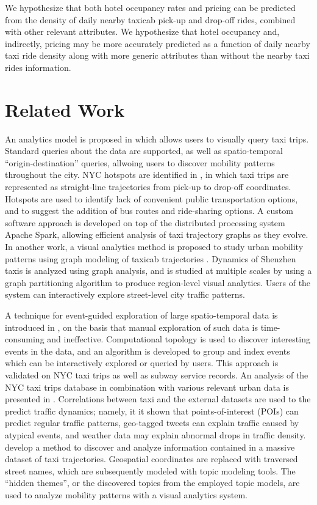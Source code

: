 \documentclass[useAMS, referee, usenatbib]{biom}
\begin{document}
We hypothesize that both hotel occupancy rates and pricing can be predicted from the density of daily nearby taxicab pick-up and drop-off rides, combined with other relevant attributes. We hypothesize that hotel occupancy and, indirectly, pricing may be more accurately predicted as a function of daily nearby taxi ride density along with more generic attributes than without the nearby taxi rides information.

\section{Related Work}
\label{s:related}

An analytics model is proposed in \citet{Ferreira2013VisualEO} which allows users to visually query taxi trips. Standard queries about the data are supported, as well as spatio-temporal ``origin-destination'' queries, allwoing users to discover mobility patterns throughout the city. NYC hotspots are identified in \citet{Stoyanovich2017ZoomingIO}, in which taxi trips are represented as straight-line trajectories from pick-up to drop-off coordinates. Hotspots are used to identify lack of convenient public transportation options, and to suggest the addition of bus routes and ride-sharing options. A custom software approach is developed on top of the distributed processing system Apache Spark, allowing efficient analysis of taxi trajectory graphs as they evolve. In another work, a visual analytics method is proposed to study urban mobility patterns using graph modeling of taxicab trajectories \citep{Huang2016TrajGraphAG}. Dynamics of Shenzhen taxis is analyzed using graph analysis, and is studied at multiple scales by using a graph partitioning algorithm to produce region-level visual analytics. Users of the system can interactively explore street-level city traffic patterns. 

A technique for event-guided exploration of large spatio-temporal data is introduced in \citet{Doraiswamy2014UsingTA}, on the basis that manual exploration of such data is time-consuming and ineffective. Computational topology is used to discover interesting events in the data, and an algorithm is developed to group and index events which can be interactively explored or queried by users. This approach is validated on NYC taxi trips as well as subway service records. An analysis of the NYC taxi trips database in combination with various relevant urban data is presented in \citet{Wu2016InterpretingTD}. Correlations between taxi and the external datasets are used to the predict traffic dynamics; namely, it it shown that points-of-interest (POIs) can predict regular traffic patterns, geo-tagged tweets can explain traffic caused by atypical events, and weather data may explain abnormal drops in traffic density. \citet{Chu2014VisualizingHT} develop a method to discover and analyze information contained in a massive dataset of taxi trajectories. Geospatial coordinates are replaced with traversed street names, which are subsequently modeled with topic modeling tools. The ``hidden themes'', or the discovered topics from the employed topic models, are used to analyze mobility patterns with a visual analytics system. 
\end{document}
